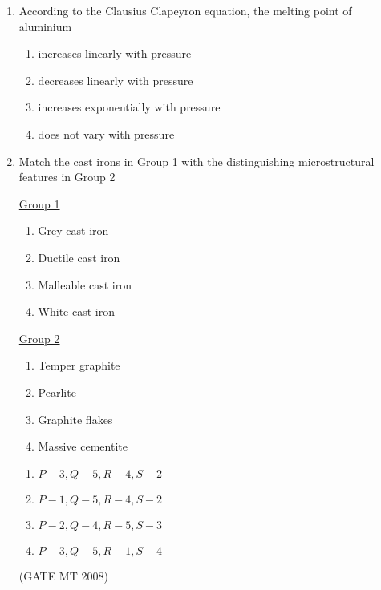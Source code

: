 \documentclass[11pt, letterpaper]{article}
\theoremstyle{remark}
\begin{document}
\begin{enumerate}[label=Q.\arabic*]
    \item According to the Clausius Clapeyron equation, the melting point of aluminium
    \vspace{-0.9em}
    \begin{multicols}{2}
        \begin{enumerate}[label=(\MakeUppercase{\alph*})]
            \item increases linearly with pressure
            \item decreases linearly with pressure
            \item increases exponentially with pressure
            \item does not vary with pressure
        \end{enumerate}
    \end{multicols}
    \vspace{-5mm}
\item Match the cast irons in Group 1 with the distinguishing microstructural features in Group 2
\begin{multicols}{2}
    \underline{Group 1}
    \begin{enumerate}[label=(\Alph*), start=16]
        \item Grey cast iron
        \item Ductile cast iron  
        \item Malleable cast iron
        \item White cast iron
    \end{enumerate}

     \underline{Group 2}
    \begin{enumerate}[label=(\arabic*), start=1]
        \item Temper graphite
        \item Pearlite
        \item Graphite flakes  
        \item Massive cementite
    \end{enumerate}
\end{multicols}
\vspace{-2em} 
    \begin{multicols}{2}
        \begin{enumerate}[label=(\MakeUppercase{\alph*})]
            \item $P-3, Q-5, R-4, S-2$
            \item $P-1, Q-5, R-4, S-2$
            \item $P-2, Q-4, R-5, S-3$
            \item $P-3, Q-5, R-1, S-4$
        \end{enumerate}
    \end{multicols}
  \hfill(GATE MT 2008) 
  

\end{enumerate}
\end{document}
